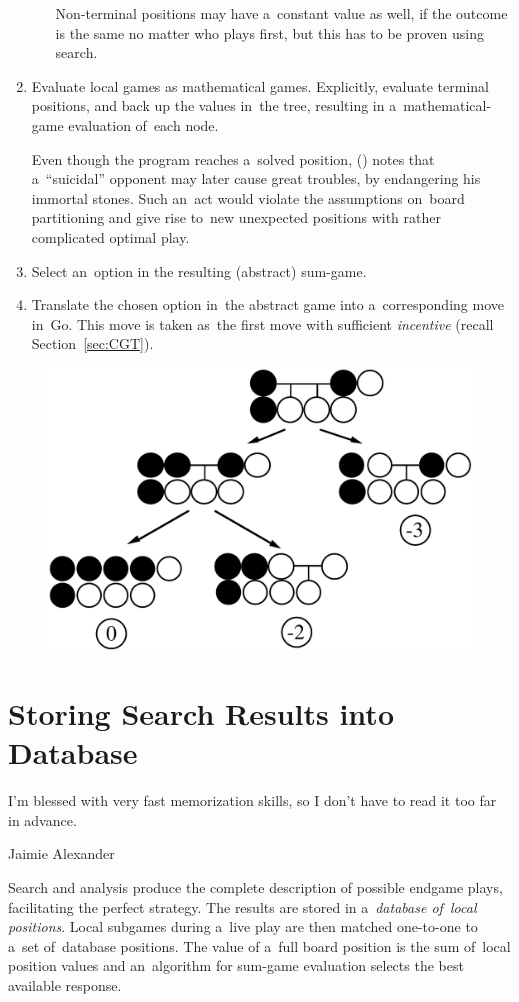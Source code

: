 \begin{enumerate}
\begin{enumerate}[(a)]
        Non-terminal positions may have a~constant value as well, if the outcome is the same no matter who plays first, but this has to be proven using search.
    \end{enumerate}

  \item Evaluate local games as mathematical games.
    Explicitly, evaluate terminal positions, and back up the values in~the tree, resulting in a~mathematical-game evaluation of~each node.

    Even though the program reaches a~solved position, (\cite{Muller1995computer}) notes that a~``suicidal'' opponent may later cause great troubles, by endangering his immortal stones.
    Such an~act would violate the assumptions on~board partitioning and give rise to~new unexpected positions with rather complicated optimal play.

  \item Select an~option in the resulting (abstract) sum-game.
  \item Translate the chosen option in~the abstract game into a~corresponding move in~Go.
    This move is taken as~the first move with sufficient \emph{incentive} (recall Section~\ref{sec:CGT}).
\end{enumerate}

\begin{figure}[H]
  \centering
  \includegraphics[width=.5\textwidth]{../img/Go_search_tree.png}
\end{figure}

\section{Storing Search Results into Database}
\epigraph{
  I'm blessed with very fast memorization skills, so I don't have to read it too far in advance.
}{Jaimie Alexander}
Search and analysis produce the complete description of possible endgame plays, facilitating the perfect strategy.
The results are stored in a~\emph{database of~local positions}.
Local subgames during a~live play are then matched one-to-one to a~set of~database positions.
The value of a~full board position is the sum of~local position values and an~algorithm for sum-game evaluation selects the best available response.

